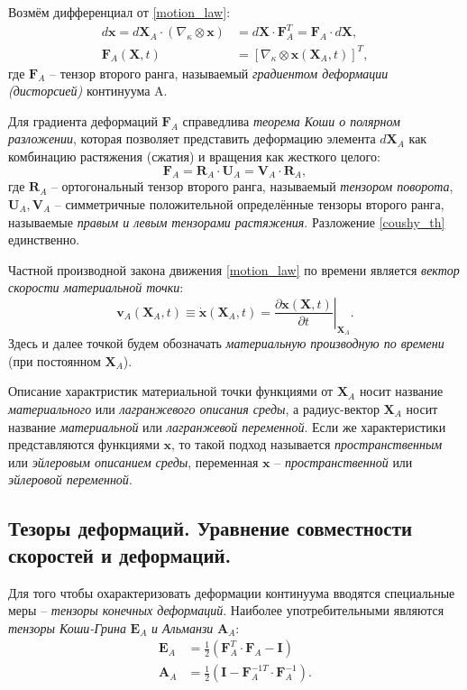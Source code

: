 	Возмём дифференциал от \eqref{motion_law}:
\begin{align}
	\label{gradient}
	d\mathbf{x} = d\mathbf{X}_A \cdot \left(\nabla_{\kappa} \otimes \mathbf{x} \right) &= d\mathbf{X} \cdot \mathbf{F}_A^T = \mathbf{F}_A \cdot d\mathbf{X},\nonumber\\
	\mathbf{F}_A(\mathbf{X}, t) &= \left[\nabla_{\kappa} \otimes \mathbf{x}(\mathbf{X}_A, t)\right]^T,
\end{align}
	где $\mathbf{F}_A$ -- тензор второго ранга, называемый \textit{градиентом деформации (дисторсией)} континуума A.
	
	Для градиента деформаций $\textbf{F}_A$ справедлива \textit{теорема Коши о полярном разложении}, которая позволяет представить деформацию элемента $d\mathbf{X}_A$ как комбинацию растяжения (сжатия) и вращения как жесткого целого:
\begin{equation}
	\label{coushy_th}
	\mathbf{F}_A = \mathbf{R}_A \cdot \mathbf{U}_A = \mathbf{V}_A \cdot \mathbf{R}_A,
\end{equation}
	где $\mathbf{R}_A$ -- ортогональный тензор второго ранга, называемый \textit{тензором поворота},
	$\mathbf{U}_A, \mathbf{V}_A$ -- симметричные положительной определённые тензоры второго ранга, называемые \textit{правым и левым тензорами растяжения}. Разложение \eqref{coushy_th} единственно.
	
	Частной производной закона движения \eqref{motion_law} по времени является \textit{вектор скорости материальной точки}:
\begin{equation}
	\label{velocity}
	\mathbf{v}_A(\mathbf{X}_A, t) \equiv \dot{\mathbf{x}}(\mathbf{X}_A, t) = \left.\frac{\partial\mathbf{x}(\mathbf{X}, t)}{\partial t}\right|_{\mathbf{X}_A}.
\end{equation}
	Здесь и далее точкой будем обозначать \textit{материальную производную по времени} (при постоянном $\mathbf{X}_A$).
	
	Описание характристик материальной точки функциями от $\mathbf{X}_A$ носит название \textit{материального} или \textit{лагранжевого описания среды}, а радиус-вектор $\textbf{X}_A$ носит название \textit{материальной} или \textit{лагранжевой переменной}. Если же характеристики представляются функциями $\mathbf{x}$, то такой подход называется \textit{пространственным} или \textit{эйлеровым описанием среды}, переменная $\mathbf{x}$ -- \textit{пространственной} или \textit{эйлеровой переменной}.

\subsection{Тезоры деформаций. Уравнение совместности скоростей и деформаций.}
	Для того чтобы охарактеризовать деформации континуума вводятся специальные меры -- \textit{тензоры конечных деформаций}. Наиболее употребительными являются \textit{тензоры Коши-Грина} $\mathbf{E}_A$ \textit{и Альманзи} $\mathbf{A}_A$:
\begin{align}
	\label{strain_measures}
	\mathbf{E}_A &= \frac{1}{2}\left(\mathbf{F}_A^T \cdot \mathbf{F}_A - \mathbf{I}\right)\\
	\mathbf{A}_A &= \frac{1}{2}\left(\mathbf{I} - \mathbf{F}_A^{-1T} \cdot \mathbf{F}_A^{-1}\right).
\end{align}

